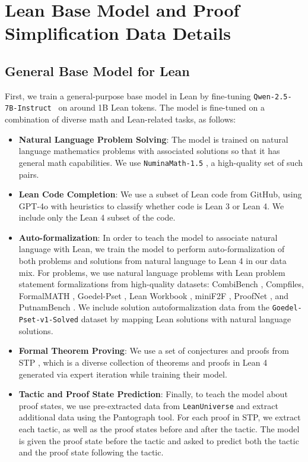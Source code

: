 \newpage
\section{Lean Base Model and Proof Simplification Data Details} \label{appendix:base-model-and-data}

\subsection{General Base Model for Lean} \label{subsec:lean-base-model}

First, we train a general-purpose base model in Lean by fine-tuning \texttt{Qwen-2.5-7B-Instruct}~\citep{qwen2} on around 1B Lean tokens. The model is fine-tuned on a combination of diverse math and Lean-related tasks, as follows:
\begin{itemize}
    \item \textbf{Natural Language Problem Solving}: The model is trained on natural language mathematics problems with associated solutions so that it has general math capabilities. We use \texttt{NuminaMath-1.5} \citep{numina_math_datasets}, a high-quality set of such pairs.
    \item \textbf{Lean Code Completion}: We use a subset of Lean code from GitHub, using GPT-4o with heuristics to classify whether code is Lean 3 or Lean 4. We include only the Lean 4 subset of the code.
    \item \textbf{Auto-formalization}: In order to teach the model to associate natural language with Lean, we train the model to perform auto-formalization of both problems and solutions from natural language to Lean 4 in our data mix. For problems, we use natural language problems with Lean problem statement formalizations from high-quality datasets: CombiBench \citep{liu2025combibench}, Compfiles, FormalMATH \citep{yu2025formalmath}, Goedel-Pset \citep{lin2025goedel}, Lean Workbook \citep{ying2024lean}, miniF2F \citep{zheng2021minif2f}, ProofNet \citep{azerbayev2023proofnet}, and PutnamBench \citep{tsoukalas2024putnambench}. We include solution autoformalization data from the \texttt{Goedel-Pset-v1-Solved} dataset by mapping Lean solutions with natural language solutions.
    \item \textbf{Formal Theorem Proving}: We use a set of conjectures and proofs from STP \citep{dong2025stp}, which is a diverse collection of theorems and proofs in Lean 4 generated via expert iteration while training their model.
    \item \textbf{Tactic and Proof State Prediction}: Finally, to teach the model about proof states, we use pre-extracted data from \texttt{LeanUniverse} \citep{ahm2025leanuniverse} and extract additional data using the Pantograph \citep{aniva2025pantograph} tool. For each proof in STP, we extract each tactic, as well as the proof states before and after the tactic. The model is given the proof state before the tactic and asked to predict both the tactic and the proof state following the tactic.
\end{itemize}

